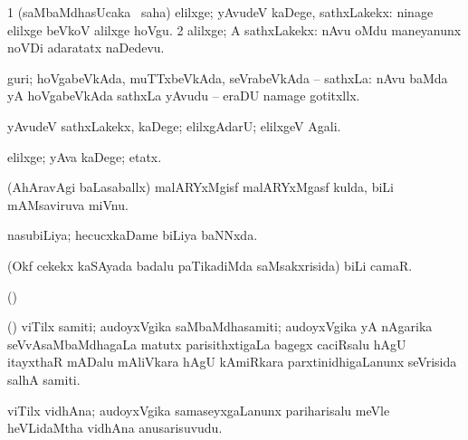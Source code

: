 {{{{{{\bentry
{} 
\gl{\saMavayx}
\bmng
\bnum
\num{1} (saMbaMdhasUcaka \kirxvi\ saha) elilxge; yAvudeV kaDege, sathxLakekx:  ninage elilxge beVkoV alilxge hoVgu. 
\num{2} alilxge; A sathxLakekx:  nAvu oMdu maneyanunx noVDi adaratatx naDedevu. 
\enum
\emng
\eentry

\bentry
{} 
\gl{\nA}
\expl{}
\bmng
guri; hoVgabeVkAda, muTTxbeVkAda, seVrabeVkAda -- sathxLa:  nAvu baMda yA hoVgabeVkAda sathxLa yAvudu -- eraDU namage gotitxllx. 
\emng
\eentry

\bentry
{} 
\expl{(\pArxparx)}
\bmng
 yAvudeV sathxLakekx, kaDege; elilxgAdarU; elilxgeV Agali. 
\emng
\eentry

\bentry
{}
  \gl{\kirxvi}\bmng
elilxge; yAva kaDege; etatx. 
\emng
\eentry

\bentry
{}
  \gl{\kirxvi}\bmng
{} 
\emng
\eentry

\bentry
{} 
\gl{\nA}
\expl{}
\bmng
{} 
\emng
\eentry

 \bentry
{} 
\gl{\nA}
\expl{}
\bmng
(AhAravAgi baLasaballx) malARYxMgisf malARYxMgasf kulda, biLi mAMsaviruva miVnu. 
\emng
\eentry

\bentry
{}
  \gl{\gu}\bmng
nasubiLiya; hecucxkaDame biLiya baNNxda. 
\emng
\eentry

\bentry
{}
  \gl{\nA}\bmng
(Okf cekekx kaSAyada badalu paTikadiMda saMsakxrisida) biLi camaR. 
\emng
\eentry

\bentry
{} 
\gl{\nA}
\bmng
(\birx)  
\emng
\eentry

\bentry
{}
 \gl{\nA}\bmng
(\birx) viTilx samiti; audoyxVgika saMbaMdhasamiti; audoyxVgika yA nAgarika seVvAsaMbaMdhagaLa matutx parisithxtigaLa bagegx caciRsalu hAgU itayxthaR mADalu mAliVkara hAgU kAmiRkara parxtinidhigaLanunx seVrisida salhA samiti. 
\emng
\eentry

\bentry
{} 
\gl{\nA}
\expl{}
\bmng
viTilx vidhAna; audoyxVgika samaseyxgaLanunx pariharisalu meVle heVLidaMtha vidhAna anusarisuvudu. 
\emng
\eentry

}}}}}}
